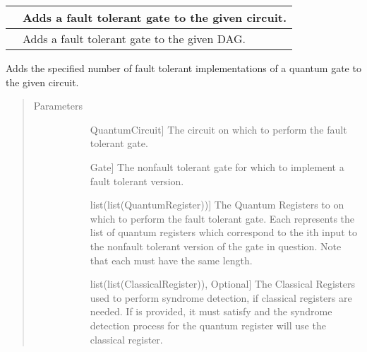 \documentclass[letterpaper,10pt,english]{sphinxmanual}
\begin{document}
\begin{fulllineitems}
\begin{savenotes}
\begin{tabulary}{\linewidth}[t]{|T|T|}
&
Adds a fault tolerant gate to the given circuit.
\\
\hline
{}
&
Adds a fault tolerant gate to the given DAG.
\\
\hline
\end{tabulary}
\par
\sphinxattableend\end{savenotes}

\begin{fulllineitems}
\label{\detokenize{Base:BaseFaultTolerance.FaultTolerantGates.addGateCircuit}}
Adds the specified number of fault tolerant implementations of a quantum gate to the given circuit.
\begin{quote}\begin{description}
\item[{Parameters}] \leavevmode\begin{description}
\item[{}] \leavevmode{[}QuantumCircuit{]}
The circuit on which to perform the fault tolerant gate.

\item[{}] \leavevmode{[}Gate{]}
The non\sphinxhyphen{}fault tolerant gate for which to implement a fault tolerant version.

\item[{}] \leavevmode{[}list(list(QuantumRegister)){]}
The Quantum Registers to on which to perform the fault tolerant gate. Each  represents the list of quantum registers which correspond to the ith input to the non\sphinxhyphen{}fault tolerant version of the gate in question. Note that each  must have the same length.

\item[{}] \leavevmode{[}list(list(ClassicalRegister)), Optional{]}
The Classical Registers used to perform syndrome detection, if classical registers are needed. If  is provided, it must satisfy  and the syndrome detection process for the  quantum register will use the  classical register.


\end{description}
\end{description}
\end{quote}
\end{fulllineitems}
\end{fulllineitems}
\end{document}
